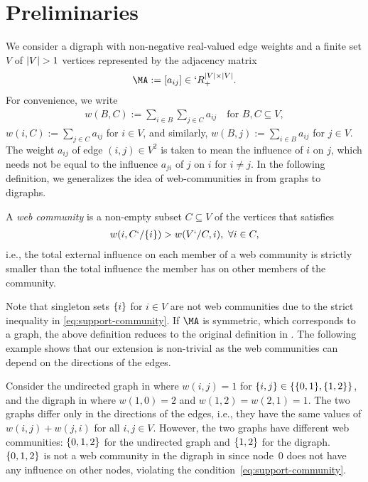 \section{Preliminaries}
\label{sec:preliminaries}

We consider a digraph with non-negative real-valued edge weights and a finite set $V$ of $\lvert V\rvert>1$ vertices represented by the adjacency matrix
\begin{align*}
  \MA := [a_{ij}]\in `R_+^{\abs{V}\times \abs{V}}.
\end{align*}
For convenience, we write
\begin{align*}
  w(B,C) := \sum_{i\in B}\sum_{j\in C} a_{ij} \quad \text{for }B,C\subseteq V,
\end{align*}
$w(i,C):=\sum_{j\in C}a_{ij}$ for $i\in V$, and similarly, $w(B,j):=\sum_{i\in B}a_{ij}$ for $j\in
V$. The weight $a_{ij}$ of edge $(i,j)\in V^2$ is taken to mean the influence of $i$ on $j$, which
needs not be equal to the influence $a_{ji}$ of $j$ on $i$ for $i\neq j$. In the following
definition, we generalizes the idea of web-communities in \cite{flake:efficient,
flake:cut-clustering} from graphs to digraphs.
\begin{definition}
  \label{def:support-community}
  A \emph{web community} is a non-empty subset $C\subseteq V$ of the vertices that satisfies
  \begin{align}
    \label{eq:support-community}
    w(i,C`/\{i\}) > w(V`/ C,i), \ \forall i \in C,
  \end{align}
  i.e., the total external influence on each member of a web community is strictly smaller than the
  total influence the member has on other members of the community. 
\end{definition}
Note that singleton sets $\{i\}$ for $i\in V$ are not web communities due to the strict inequality in \eqref{eq:support-community}. If $\MA$ is symmetric, which corresponds to a graph, the above definition reduces
to the original definition in \cite{flake:cut-clustering}. The following example shows that our extension is non-trivial as the web communities can depend on the directions of the edges.

\begin{example}
  \label{eg:directed-undirected}
  Consider the undirected graph in  where $w(i,j)=1$ for $\{i,j\}\in \{\{0,1\},\{1,2\}\}$, and the digraph in  where $w(1,0)=2$ and $w(1,2)=w(2,1)=1$. The two graphs differ only in the directions of the edges, i.e., they have the same values of $w(i,j)+w(j,i)$ for all $i,j\in V$. However, the two graphs have different web communities: $\{0,1,2\}$ for the undirected graph and $\{1,2\}$ for the digraph. $\{0,1,2\}$ is not a web community in the digraph in  since node~$0$ does not have any influence on other nodes, violating the condition~\eqref{eq:support-community}.
\end{example}

